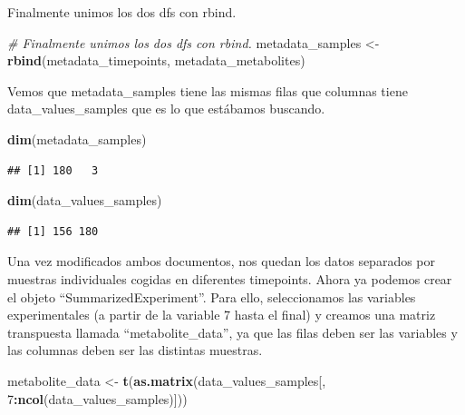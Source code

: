 \documentclass[
]{article}
\newenvironment{Shaded}{\begin{snugshade}}{\end{snugshade}}
\newcommand{\CommentTok}[1]{\textcolor[rgb]{0.56,0.35,0.01}{\textit{#1}}}
\newcommand{\DecValTok}[1]{\textcolor[rgb]{0.00,0.00,0.81}{#1}}
\newcommand{\FunctionTok}[1]{\textcolor[rgb]{0.13,0.29,0.53}{\textbf{#1}}}
\newcommand{\NormalTok}[1]{#1}
\newcommand{\OtherTok}[1]{\textcolor[rgb]{0.56,0.35,0.01}{#1}}
\newcommand{\SpecialCharTok}[1]{\textcolor[rgb]{0.81,0.36,0.00}{\textbf{#1}}}
\begin{document}
Finalmente unimos los dos dfs con rbind.

\begin{Shaded}
\begin{Highlighting}[]
\CommentTok{\# Finalmente unimos los dos dfs con rbind.}
\NormalTok{metadata\_samples }\OtherTok{\textless{}{-}} \FunctionTok{rbind}\NormalTok{(metadata\_timepoints, metadata\_metabolites)}
\end{Highlighting}
\end{Shaded}

Vemos que metadata\_samples tiene las mismas filas que columnas tiene
data\_values\_samples que es lo que estábamos buscando.

\begin{Shaded}
\begin{Highlighting}[]
\FunctionTok{dim}\NormalTok{(metadata\_samples)}
\end{Highlighting}
\end{Shaded}

\begin{verbatim}
## [1] 180   3
\end{verbatim}

\begin{Shaded}
\begin{Highlighting}[]
\FunctionTok{dim}\NormalTok{(data\_values\_samples)}
\end{Highlighting}
\end{Shaded}

\begin{verbatim}
## [1] 156 180
\end{verbatim}

Una vez modificados ambos documentos, nos quedan los datos separados por
muestras individuales cogidas en diferentes timepoints. Ahora ya podemos
crear el objeto ``SummarizedExperiment''. Para ello, seleccionamos las
variables experimentales (a partir de la variable 7 hasta el final) y
creamos una matriz transpuesta llamada ``metabolite\_data'', ya que las
filas deben ser las variables y las columnas deben ser las distintas
muestras.

\begin{Shaded}
\begin{Highlighting}[]
\NormalTok{metabolite\_data }\OtherTok{\textless{}{-}} \FunctionTok{t}\NormalTok{(}\FunctionTok{as.matrix}\NormalTok{(data\_values\_samples[, }\DecValTok{7}\SpecialCharTok{:}\FunctionTok{ncol}\NormalTok{(data\_values\_samples)]))}
\end{Highlighting}
\end{Shaded}
\end{document}
